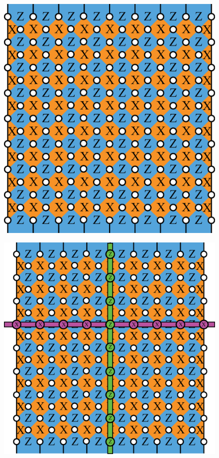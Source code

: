 \documentclass[a4paper,11pt]{ltjsarticle}
\begin{document}
{{        \begin{figure}[h]
            \centering
            \includegraphics[scale=0.40]{figure/planar.eps}
            \vspace{0pt}\caption{}
            \label{planar}
            \vspace{-10pt}
        \end{figure}

        \begin{figure}[h]
            \centering
            \includegraphics[scale=0.40]{figure/logical_operator_planar.eps}
            \vspace{0pt}\caption{}
            \label{logaical_operator_planar}
            \vspace{-10pt}
        \end{figure}

        
    }
}
\end{document}
